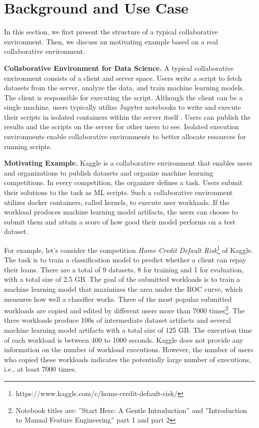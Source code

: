 \section{Background and Use Case} \label{sec-background}
In this section, we first present the structure of a typical collaborative environment.
Then, we discuss an motivating example based on a real collaborative environment.

\textbf{Collaborative Environment for Data Science.}
A typical collaborative environment consists of a client and server space.
Users write a script to fetch datasets from the server, analyze the data, and train machine learning models.
The client is responsible for executing the script.
Although the client can be a single machine, users typically utilize Jupyter notebooks  \cite{Kluyver:2016aa} to write and execute their scripts in isolated containers \cite{merkel2014docker} within the server itself \cite{kagglewebsite, googlecolab, netflix-notebook}.
Users can publish the results and the scripts on the server for other users to see.
Isolated execution environments enable collaborative environments to better allocate resources for running scripts.

\textbf{Motivating Example.}
Kaggle is a collaborative environment that enables users and organizations to publish datasets and organize machine learning competitions.
In every competition, the organizer defines a task.
Users submit their solutions to the task as ML scripts.
Such a collaborative environment utilizes docker containers, called kernels, to execute user workloads.
If the workload produces machine learning model artifacts, the users can choose to submit them and attain a score of how good their model performs on a test dataset.

For example, let's consider the competition \textit{Home Credit Default Risk}\footnote{https://www.kaggle.com/c/home-credit-default-risk/} of Kaggle.
The task is to train a classification model to predict whether a client can repay their loans.
There are a total of 9 datasets, 8 for training and 1 for evaluation, with a total size of 2.5 GB.
The goal of the submitted workloads is to train a machine learning model that maximizes the area under the ROC curve, which measures how well a classifier works.
Three of the most popular submitted workloads are copied and edited by different users more than 7000 times\footnote{Notebook titles are: ''Start Here: A Gentle Introduction'' and ''Introduction to Manual Feature Engineering'' part 1 and part 2}.
The three workloads produce 100s of intermediate dataset artifacts and several machine learning model artifacts with a total size of 125 GB.
The execution time of each workload is between 400 to 1000 seconds.
Kaggle does not provide any information on the number of workload executions.
However, the number of users who copied these workloads indicates the potentially large number of executions, i.e., at least 7000 times.

